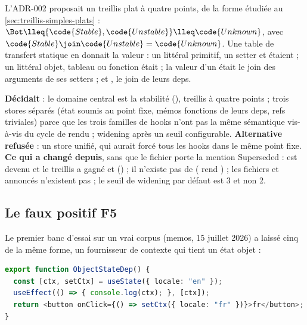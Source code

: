 L'ADR-002 proposait un treillis plat à quatre points, de la forme étudiée au
\cref{sec:treillis-simples-plats} : $\Bot \lleq \{\code{Stable},
\code{Unstable}\} \lleq \code{Unknown}$, avec $\code{Stable} \join
\code{Unstable} = \code{Unknown}$. Une table de transfert statique en
donnait la valeur : un littéral primitif, un setter et 
étaient  ; un littéral objet, tableau ou fonction était
 ; la valeur d'un  était le join des
arguments de ses setters ;  et , le join de
leurs deps.

\begin{decision}
\textbf{Décidait} : le domaine central est la stabilité (),
treillis à quatre points ; trois stores séparés (état soumis au point fixe,
mémos fonctions de leurs deps, refs triviales) parce que les trois familles
de hooks n'ont pas la même sémantique vis-à-vis du cycle de rendu ; widening
après un seuil configurable. \textbf{Alternative refusée} : un store unifié,
qui aurait forcé tous les hooks dans le même point fixe. \textbf{Ce qui a
changé depuis}, sans que le fichier porte la mention \og Superseded\fg{} :
 est devenu  et le treillis a gagné
 et  () ; il n'existe pas de
 ( rend ) ; les fichiers
 et  annoncés
n'existent pas ; le seuil de widening par défaut est 3 et non 2.
\end{decision}

\subsection{Le faux positif F5}

Le premier banc d'essai sur un vrai corpus (\og memos\fg{}, 15 juillet 2026)
a laissé cinq \Warning{}  de la même forme, un
fournisseur de contexte qui tient un état objet :

\begin{lstlisting}[language=TypeScript,caption={Un état objet en dep (\file{/tmp/ch10/stability.tsx}, extrait)},label={lst:statevalue-stabilite-objstate}]
export function ObjectStateDep() {
  const [ctx, setCtx] = useState({ locale: "en" });
  useEffect(() => { console.log(ctx); }, [ctx]);
  return <button onClick={() => setCtx({ locale: "fr" })}>fr</button>;
}
\end{lstlisting}

